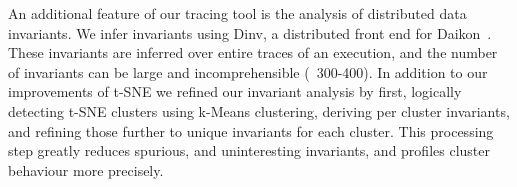 An additional feature of our tracing tool is the analysis of
distributed data invariants. We infer invariants using Dinv, a
distributed front end for Daikon~\cite{Ernst99dynamicallydiscovering}.
These invariants are inferred over entire traces of an execution, and
the number of invariants can be large and incomprehensible (~300-400).
In addition to our improvements of t-SNE we refined our invariant
analysis by first, logically detecting t-SNE clusters using k-Means
clustering, deriving per cluster invariants, and refining those
further to unique invariants for each cluster. This processing step
greatly reduces spurious, and uninteresting invariants, and profiles
cluster behaviour more precisely.


